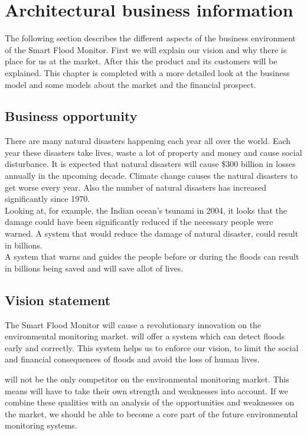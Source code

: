 \chapter{Architectural business information}
\label{ch:business}
The following section describes the different aspects of the business environment of the Smart Flood Monitor. First we will explain our vision and why there is place for us at the market. After this the product and its customers will be explained. This chapter is completed with a more detailed look at the business model and some models about the market and the financial prospect.

\section{Business opportunity}
There are many natural disasters happening each year all over the world. Each year these disasters take lives, waste a lot of property and money and cause social disturbance. It is expected that natural disasters will cause \$300 billion in losses annually in the upcoming decade. Climate change causes the natural disasters to get worse every year. Also the number of natural disasters has increased significantly since 1970.\\
Looking at, for example, the Indian ocean's tsunami in 2004, it looks that the damage could have been significantly reduced if the necessary people were warned. A system that would reduce the damage of natural disaster, could result in billions. \\
A system that warns and guides the people before or during the floods can result in billions being saved and will save allot of lives.

\section{Vision statement}
The Smart Flood Monitor will cause a revolutionary innovation on the environmental monitoring market. \CompanyName will offer a system which can detect floods early and correctly. This system helps us to enforce our vision, to limit the social and financial consequences of floods and avoid the loss of human lives. 

\CompanyName will not be the only competitor on the environmental monitoring market. This means \CompanyName will have to take their own strength and weaknesses into account. If we combine these qualities with an analysis of the opportunities and weaknesses on the market, we should be able to become a core part of the future environmental monitoring systems.\\\\

